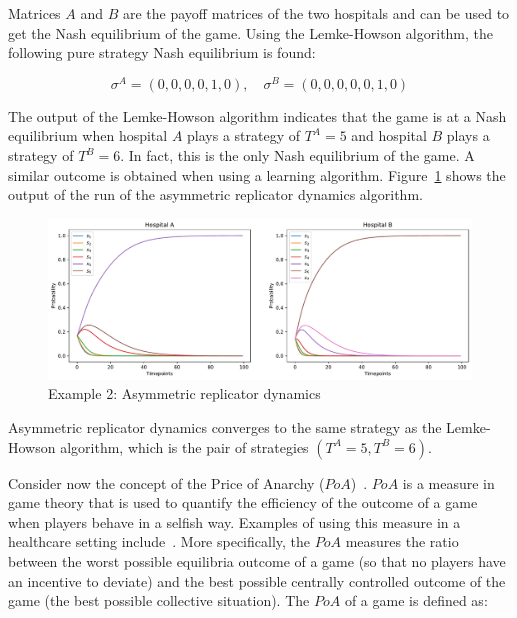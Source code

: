 Matrices \(A\) and \(B\) are the payoff matrices of the two hospitals and
can be used to get the Nash equilibrium of the game.
Using the Lemke-Howson algorithm, the following pure strategy Nash equilibrium
is found:

\begin{equation}
    \sigma^A = (0, 0, 0, 0, 1, 0), \quad
    \sigma^B = (0, 0, 0, 0, 0, 1, 0)
\end{equation}

The output of the Lemke-Howson algorithm indicates that the game is at a Nash
equilibrium when hospital \(A\) plays a strategy of \(T^A = 5\) and hospital
\(B\) plays a strategy of \(T^B = 6\).
In fact, this is the only Nash equilibrium of the game.
A similar outcome is obtained when using a learning algorithm.
Figure~\ref{fig:asymmetric_replicator_dynamics_example_2} shows the output of
the run of the asymmetric replicator dynamics algorithm.

\begin{figure}[H]
    \centering
    \includegraphics[width=\linewidth]{chapters/05_numerical_results/Bin/example_2/base_case.pdf}
    \caption{Example 2: Asymmetric replicator dynamics}
    \label{fig:asymmetric_replicator_dynamics_example_2}
\end{figure}

Asymmetric replicator dynamics converges to the same strategy as the Lemke-
Howson algorithm, which is the pair of strategies \((T^A = 5, T^B = 6)\).

Consider now the concept of the Price of Anarchy
(\(PoA\))~\cite{roughgarden2005selfish}.
\(PoA\) is a measure in game theory that is used to quantify the efficiency of
the outcome of a game when players behave in a selfish way.
Examples of using this measure in a healthcare setting
include~\cite{knight_public_services, knight_overview_patient_flow,
nicolaides2013price}.
More specifically, the \(PoA\) measures the ratio between the worst possible
equilibria outcome of a game (so that no players have an incentive to deviate)
and the best possible centrally controlled outcome of the game (the best
possible collective situation).
The \(PoA\) of a game is defined as:

